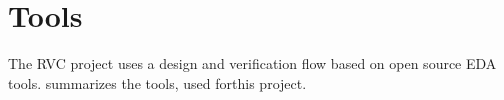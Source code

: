 
\section{Tools}
\label{tools}

The RVC project uses a design and verification flow based on open source EDA tools.
 summarizes the tools, used forthis project. 

